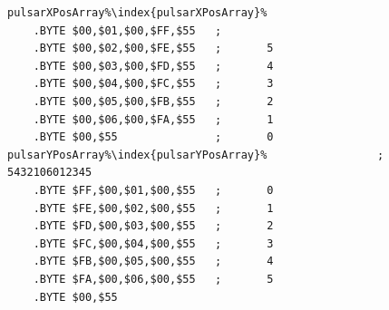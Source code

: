 \begin{minipage}[b]{0.48\linewidth}
\begin{lrbox}{\mybox}%
\begin{lstlisting}[basicstyle=\ttfamily\tiny,escapechar=\%]
pulsarXPosArray%\index{pulsarXPosArray}%
    .BYTE $00,$01,$00,$FF,$55   ;
    .BYTE $00,$02,$00,$FE,$55   ;       5      
    .BYTE $00,$03,$00,$FD,$55   ;       4      
    .BYTE $00,$04,$00,$FC,$55   ;       3      
    .BYTE $00,$05,$00,$FB,$55   ;       2      
    .BYTE $00,$06,$00,$FA,$55   ;       1      
    .BYTE $00,$55               ;       0      
pulsarYPosArray%\index{pulsarYPosArray}%                 ; 5432106012345
    .BYTE $FF,$00,$01,$00,$55   ;       0      
    .BYTE $FE,$00,$02,$00,$55   ;       1      
    .BYTE $FD,$00,$03,$00,$55   ;       2      
    .BYTE $FC,$00,$04,$00,$55   ;       3      
    .BYTE $FB,$00,$05,$00,$55   ;       4      
    .BYTE $FA,$00,$06,$00,$55   ;       5      
    .BYTE $00,$55                   
\end{lstlisting}
\end{lrbox}%
\scalebox{0.8}{\usebox{\mybox}}

\end{minipage}
